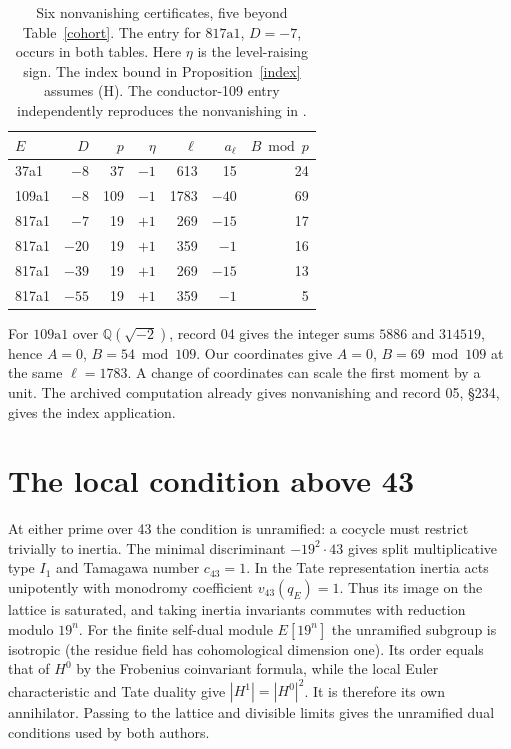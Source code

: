 \documentclass[11pt]{article}
\newcommand{\Q}{\mathbb Q}
\begin{document}
\begin{appendices}
\begin{table}[!ht]
\centering
\caption{Six nonvanishing certificates, five beyond Table~\ref{cohort}. The entry for $817\mathrm a1$, $D=-7$, occurs in both tables. Here $\eta$ is the level-raising sign. The index bound in Proposition~\ref{index} assumes (H). The conductor-109 entry independently reproduces the nonvanishing in \cite[\S\S227--228]{record}.}\label{six}
\begin{tabular}{lrrrrrr}
\toprule
$E$ & $D$ & $p$ & $\eta$ & $\ell$ & $a_\ell$ & $B\bmod p$\\
\midrule
37a1 & $-8$ & 37 & $-1$ & 613 & 15 & 24\\
109a1 & $-8$ & 109 & $-1$ & 1783 & $-40$ & 69\\
817a1 & $-7$ & 19 & $+1$ & 269 & $-15$ & 17\\
817a1 & $-20$ & 19 & $+1$ & 359 & $-1$ & 16\\
817a1 & $-39$ & 19 & $+1$ & 269 & $-15$ & 13\\
817a1 & $-55$ & 19 & $+1$ & 359 & $-1$ & 5\\
\bottomrule
\end{tabular}
\end{table}

For $109\mathrm a1$ over $\Q(\sqrt{-2})$, record 04 gives the integer sums
$5886$ and $314519$, hence $A=0$, $B=54\bmod109$. Our coordinates give
$A=0$, $B=69\bmod109$ at the same $\ell=1783$. A change of coordinates can
scale the first moment by a unit. The archived computation already gives
nonvanishing and record 05, \S234, gives the index application.

\section{The local condition above 43}\label{tame}
At either prime over 43 the condition is unramified: a cocycle must restrict trivially to inertia. The minimal discriminant $-19^2\cdot43$ gives split multiplicative type $I_1$ and Tamagawa number $c_{43}=1$. In the Tate representation inertia acts unipotently with monodromy coefficient $v_{43}(q_E)=1$. Thus its image on the lattice is saturated, and taking inertia invariants commutes with reduction modulo $19^n$. For the finite self-dual module $E[19^n]$ the unramified subgroup is isotropic (the residue field has cohomological dimension one). Its order equals that of $H^0$ by the Frobenius coinvariant formula, while the local Euler characteristic and Tate duality give $|H^1|=|H^0|^2$. It is therefore its own annihilator. Passing to the lattice and divisible limits gives the unramified dual conditions used by both authors.
\end{appendices}
\end{document}
